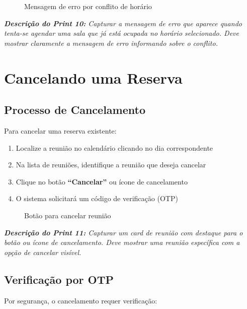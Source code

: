 \documentclass[12pt,a4paper]{article}
\begin{document}
\begin{figure}[H]
    \centering
    \caption{Mensagem de erro por conflito de horário}
    \label{fig:conflito}
\end{figure}

\textit{\textbf{Descrição do Print 10:} Capturar a mensagem de erro que aparece quando tenta-se agendar uma sala que já está ocupada no horário selecionado. Deve mostrar claramente a mensagem de erro informando sobre o conflito.}

\newpage

\section{Cancelando uma Reserva}

\subsection{Processo de Cancelamento}

Para cancelar uma reserva existente:

\begin{enumerate}[leftmargin=*]
    \item Localize a reunião no calendário clicando no dia correspondente
    \item Na lista de reuniões, identifique a reunião que deseja cancelar
    \item Clique no botão \textbf{``Cancelar''} ou ícone de cancelamento
    \item O sistema solicitará um código de verificação (OTP)
\end{enumerate}

\begin{figure}[H]
    \centering
    \caption{Botão para cancelar reunião}
    \label{fig:botao_cancelar}
\end{figure}

\textit{\textbf{Descrição do Print 11:} Capturar um card de reunião com destaque para o botão ou ícone de cancelamento. Deve mostrar uma reunião específica com a opção de cancelar visível.}

\subsection{Verificação por OTP}

Por segurança, o cancelamento requer verificação:
\end{document}
